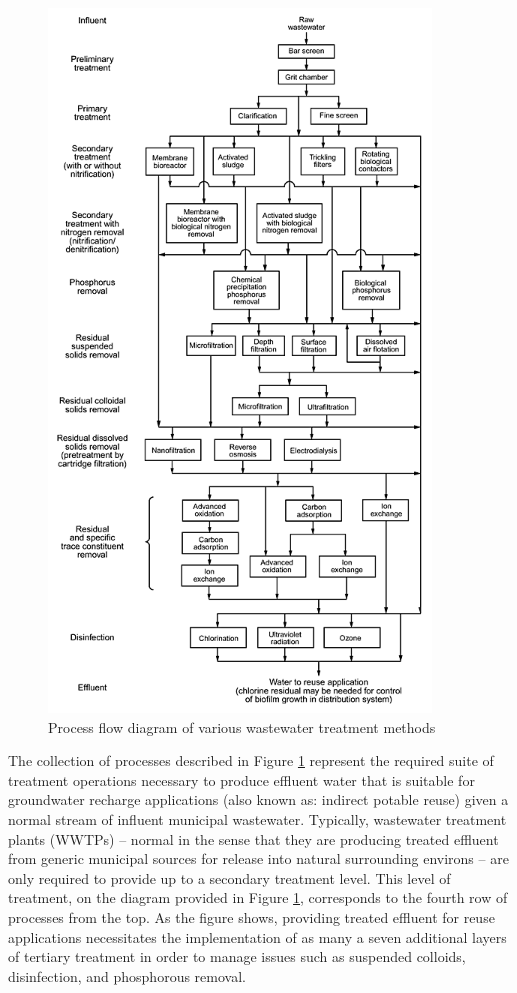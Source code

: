     \begin{figure}[!h]
       \centering
       \includegraphics[width=4in]{figures/process-flow.png}
       \caption[Process Flow Diagram of Wastewater Treatment Methods]{Process flow diagram of various wastewater treatment methods}
       \label{fig:process-flow-diagram}
     \end{figure}

The collection of processes described in Figure \ref{fig:process-flow-diagram} represent the required suite of treatment operations necessary to produce effluent water that is suitable for groundwater recharge applications (also known as: indirect potable reuse) given a normal stream of influent municipal wastewater. Typically, wastewater treatment plants (WWTPs) -- normal in the sense that they are producing treated effluent from generic municipal sources for release into natural surrounding environs -- are only required to provide up to a secondary treatment level. This level of treatment, on the diagram provided in Figure \ref{fig:process-flow-diagram}, corresponds to the fourth row of processes from the top. As the figure shows, providing treated effluent for reuse applications necessitates the implementation of as many a seven additional layers of tertiary treatment in order to manage issues such as suspended colloids, disinfection, and phosphorous removal.

